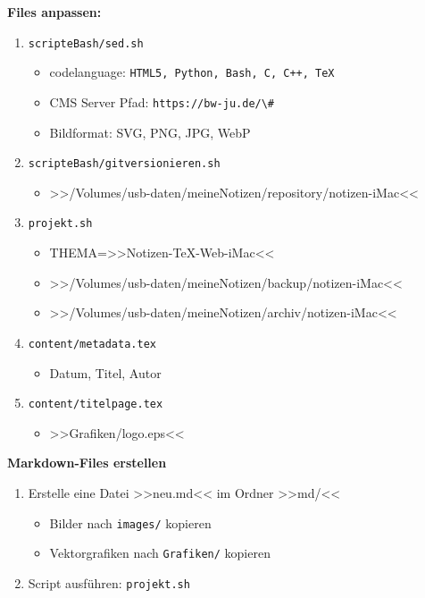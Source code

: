 \textbf{Files anpassen:}

\begin{enumerate}
\item
  \verb|scripteBash/sed.sh|

  \begin{itemize}
  \item
    codelanguage:
    \verb|HTML5, Python, Bash, C, C++, TeX|
  \item
    CMS Server Pfad: \verb|https://bw-ju.de/\#|
  \item
    Bildformat: SVG, PNG, JPG, WebP
  \end{itemize}
\item
  \verb|scripteBash/gitversionieren.sh|

  \begin{itemize}
  \item
    >>/Volumes/usb-daten/meineNotizen/repository/notizen-iMac<<
  \end{itemize}
\item
  \verb|projekt.sh|

  \begin{itemize}
  \item
    THEMA=>>Notizen-TeX-Web-iMac<<
  \item
    >>/Volumes/usb-daten/meineNotizen/backup/notizen-iMac<<
  \item
    >>/Volumes/usb-daten/meineNotizen/archiv/notizen-iMac<<
  \end{itemize}
\item
  \verb|content/metadata.tex|

  \begin{itemize}
  \item
    Datum, Titel, Autor
  \end{itemize}
\item
  \verb|content/titelpage.tex|

  \begin{itemize}
  \item
    >>Grafiken/logo.eps<<
  \end{itemize}
\end{enumerate}

\textbf{Markdown-Files erstellen}

\begin{enumerate}
\item
  Erstelle eine Datei >>neu.md<< im Ordner >>md/<<

  \begin{itemize}
  \item
    Bilder nach \verb|images/| kopieren
  \item
    Vektorgrafiken nach \verb|Grafiken/| kopieren
  \end{itemize}
\item
  Script ausführen: \verb|projekt.sh|
\end{enumerate}

